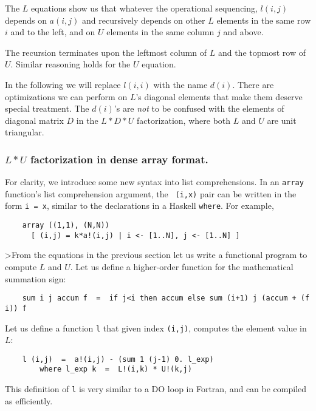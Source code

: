 The $L$ equations show us that whatever the operational sequencing,
$l(i,j)$ depends on $a(i,j)$ and recursively depends on
other $L$ elements in the same row $i$ and to the left,
and on $U$ elements in the same column $j$ and above. 

The recursion terminates upon the leftmost column of $L$ and the
topmost row of $U$.  Similar reasoning holds for the $U$
equation.

In the following we will replace $l(i,i)$ with the name $d(i)$.
There are optimizations we can perform on $L$'s diagonal
elements that make them deserve special treatment.  The $d(i)$'s
are {\em not} to be confused with the elements of diagonal matrix
$D$ in the $L*D*U$ factorization, where both $L$ and $U$
are unit triangular.

\subsubsection{$L*U$ factorization in dense array format.}

For clarity, we introduce some new syntax into list comprehensions.
In an {\tt array} function's list comprehension argument, the {\tt
(i,x)} pair can be written in the form {\tt i = x}, similar to the
declarations in a Haskell {\tt where}.  For example,
\begin{verbatim}
    array ((1,1), (N,N))
      [ (i,j) = k*a!(i,j) | i <- [1..N], j <- [1..N] ]
\end{verbatim}

>From the equations in the previous section let us write a functional
program to compute $L$ and $U$.  Let us define a higher-order function
for the mathematical summation sign:
\begin{verbatim}
    sum i j accum f  =  if j<i then accum else sum (i+1) j (accum + (f i)) f
\end{verbatim}
Let us define a function {\tt l} that given index {\tt (i,j)},
computes the element value in $L$:
\begin{verbatim}
    l (i,j)  =  a!(i,j) - (sum 1 (j-1) 0. l_exp)
        where l_exp k  =  L!(i,k) * U!(k,j)
\end{verbatim}
This definition of {\tt l} is very similar to a DO loop in Fortran,
and can be compiled as efficiently.

